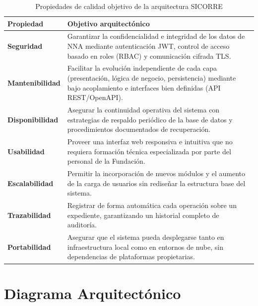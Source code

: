\begin{table}[h!]
	\centering
	\caption{Propiedades de calidad objetivo de la arquitectura SICORRE}
	\renewcommand{\arraystretch}{1.4}
	\begin{tabular}{|p{3.5cm}|p{9.5cm}|}
		\hline
		\textbf{Propiedad}          & \textbf{Objetivo arquitectónico}                                                                 \\ \hline
		\textbf{Seguridad}          & Garantizar la confidencialidad e integridad de los datos de NNA mediante autenticación JWT,
		control de acceso basado en roles (RBAC) y comunicación cifrada TLS.                             \\ \hline
		\textbf{Mantenibilidad}     & Facilitar la evolución independiente de cada capa (presentación, lógica de negocio,
		persistencia) mediante bajo acoplamiento e interfaces bien definidas (API REST/OpenAPI).          \\ \hline
		\textbf{Disponibilidad}     & Asegurar la continuidad operativa del sistema con estrategias de respaldo periódico de la
		base de datos y procedimientos documentados de recuperación.                                      \\ \hline
		\textbf{Usabilidad}         & Proveer una interfaz web responsiva e intuitiva que no requiera formación técnica
		especializada por parte del personal de la Fundación.                                             \\ \hline
		\textbf{Escalabilidad}      & Permitir la incorporación de nuevos módulos y el aumento de la carga de usuarios
		sin rediseñar la estructura base del sistema.                                                     \\ \hline
		\textbf{Trazabilidad}       & Registrar de forma automática cada operación sobre un expediente, garantizando
		un historial completo de auditoría.                                                               \\ \hline
		\textbf{Portabilidad}       & Asegurar que el sistema pueda desplegarse tanto en infraestructura local como en
		entornos de nube, sin dependencias de plataformas propietarias.                                  \\ \hline
	\end{tabular}
	\label{tab:propiedades-arq}
\end{table}

\section{Diagrama Arquitectónico}


